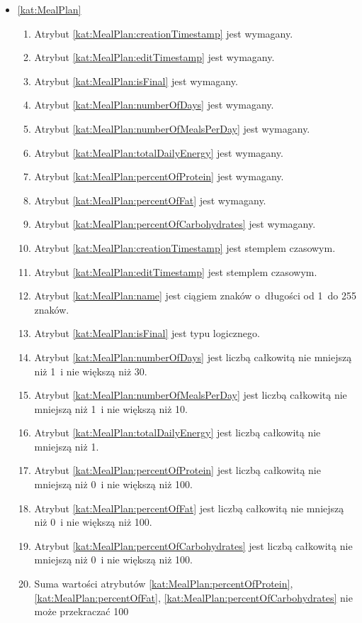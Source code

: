 \begin{itemize}[label={\textbf{Ograniczenia dla}}, wide, labelwidth=!, labelindent=0pt]
    \setlength\itemsep{1.75em}
    \item\ref{kat:MealPlan}\mynobreakpar
    \begin{enumerate}[label={\textbf{OGR/4/\protect\twodigits{\arabic{enumi}}}}, wide, labelwidth=!, align=left, leftmargin=3cm]
        \item Atrybut \ref{kat:MealPlan:creationTimestamp} jest wymagany.
        \item Atrybut \ref{kat:MealPlan:editTimestamp} jest wymagany.
        \item Atrybut \ref{kat:MealPlan:isFinal} jest wymagany.
        \item Atrybut \ref{kat:MealPlan:numberOfDays}  jest wymagany.
        \item Atrybut \ref{kat:MealPlan:numberOfMealsPerDay} jest wymagany.
        \item Atrybut \ref{kat:MealPlan:totalDailyEnergy} jest wymagany.
        \item Atrybut \ref{kat:MealPlan:percentOfProtein} jest wymagany.
        \item Atrybut \ref{kat:MealPlan:percentOfFat} jest wymagany.
        \item Atrybut \ref{kat:MealPlan:percentOfCarbohydrates} jest wymagany.

        \item Atrybut \ref{kat:MealPlan:creationTimestamp} jest stemplem czasowym.
        \item Atrybut \ref{kat:MealPlan:editTimestamp} jest stemplem czasowym.
        \item Atrybut \ref{kat:MealPlan:name} jest ciągiem znaków o~długości od 1~do 255 znaków.
        \item Atrybut \ref{kat:MealPlan:isFinal} jest typu logicznego.
        \item Atrybut \ref{kat:MealPlan:numberOfDays} jest liczbą całkowitą nie mniejszą niż 1~i nie większą niż 30.
        \item Atrybut \ref{kat:MealPlan:numberOfMealsPerDay} jest liczbą całkowitą nie mniejszą niż 1~i nie większą niż 10.
        \item Atrybut \ref{kat:MealPlan:totalDailyEnergy} jest liczbą całkowitą nie mniejszą niż 1.
        \item Atrybut \ref{kat:MealPlan:percentOfProtein} jest liczbą całkowitą nie mniejszą niż 0~i nie większą niż 100.
        \item Atrybut \ref{kat:MealPlan:percentOfFat} jest liczbą całkowitą nie mniejszą niż 0~i nie większą niż 100.
        \item Atrybut \ref{kat:MealPlan:percentOfCarbohydrates} jest liczbą całkowitą nie mniejszą niż 0~i nie większą niż 100.
        \item Suma wartości atrybutów \ref{kat:MealPlan:percentOfProtein}, \ref{kat:MealPlan:percentOfFat}, \ref{kat:MealPlan:percentOfCarbohydrates} nie może przekraczać 100
    \end{enumerate}


\end{itemize}
